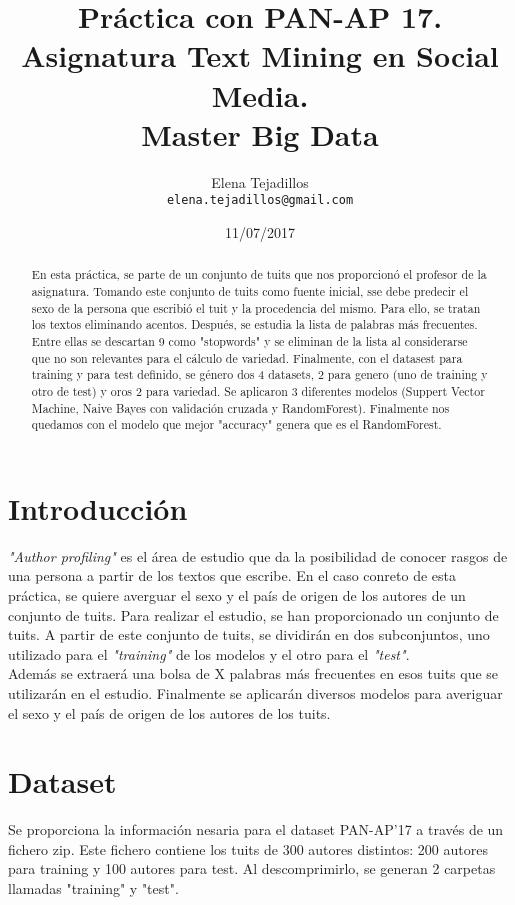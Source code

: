 \documentclass[11pt,a4paper]{article}
\title{Práctica con PAN-AP 17.\\ 
 Asignatura Text Mining en Social Media.\\ 
 Master Big Data}
\author{Elena Tejadillos \\
  {\tt elena.tejadillos@gmail.com} \\}
\date{11/07/2017}
\begin{document}
\maketitle
\begin{abstract}
  En esta práctica, se parte de un conjunto de tuits que nos proporcionó el profesor de la asignatura. Tomando este conjunto de tuits como fuente inicial, sse debe predecir el sexo de la persona que escribió el tuit y la procedencia del mismo. Para ello, se tratan los textos eliminando acentos. Después, se estudia la lista de palabras más frecuentes. Entre ellas se descartan 9 como "stopwords" y se eliminan de la lista al considerarse que no son relevantes para el cálculo de variedad. Finalmente, con el datasest para training y para test definido, se  género dos 4 datasets, 2 para genero (uno de training y otro de test) y oros 2 para variedad. Se aplicaron 3 diferentes modelos (Suppert Vector Machine, Naive Bayes con validación cruzada y RandomForest). Finalmente nos quedamos con el modelo que mejor "accuracy" genera que es el RandomForest. 
\end{abstract}


\section{Introducción}

\textit{"Author profiling"} es el área de estudio que da la posibilidad de conocer rasgos de una persona a partir de los textos que escribe. En el caso conreto de esta práctica, se quiere averguar el sexo y el país de origen de los autores de un conjunto de tuits. Para realizar el estudio, se han proporcionado un conjunto de tuits. A partir de este conjunto de tuits, se dividirán en dos subconjuntos, uno utilizado para el \textit{"training"} de los modelos y el otro para el \textit{"test"}.\\

Además se extraerá una bolsa de X palabras más frecuentes en esos tuits que se utilizarán en el estudio. Finalmente se aplicarán diversos modelos para averiguar el sexo y el país de origen de los autores de los tuits.


\section{Dataset}

Se proporciona la información nesaria para el dataset PAN-AP'17 a través de un fichero zip. Este fichero contiene los tuits de 300 autores distintos: 200 autores para training y 100 autores para test.
Al descomprimirlo, se generan 2 carpetas llamadas "training" y "test".\\ 
\end{document}
